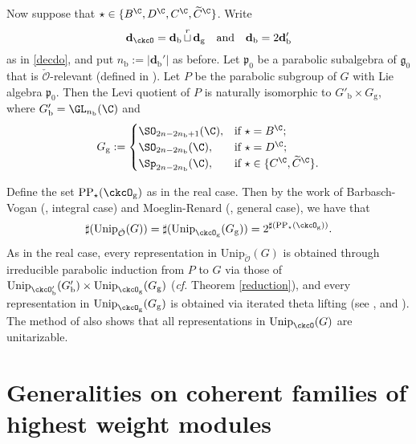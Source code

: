 \documentclass[12pt]{amsart}
\def\abs#1{\left|{#1}\right|}
\newcommand{\CO}{{\mathcal {O}}}
\newcommand{\g}{\mathfrak g}
\newcommand{\p}{\mathfrak p}
\numberwithin{equation}{section}
\theoremstyle{remark}
\def\cf{\emph{cf.} }
\def\Unip{\mathrm{Unip}}
\def\cuprow{{\stackrel{r}{\sqcup}}}
\def\CPP{\mathrm{PP}}
\def\cuprow{{\,\stackrel{r}{\sqcup}\,}}
\def\ckcOg{\ckcO_{\mathrm g}}
\def\Gpb{G'_{\mathrm b}}
\def\Gg{G_{\mathrm g}}
\begin{document}
Now suppose that $\star\in \{B^\C,D^\C, C^\C, \widetilde C^\C\}$. Write
\[
 \mathbf d_\ckcO=\mathbf d_\mathrm b\cuprow \mathbf d_\mathrm g\quad\textrm{and}\quad \mathbf d_\mathrm b=2 \mathbf d_\mathrm b'
\]
as in \eqref{decdo}, and put $n_\mathrm b:=\abs{\mathbf d_\mathrm b'}$ as before. %
Let $\p_0$ be a parabolic subalgebra of $\g_0$ that is $\check \CO$-relevant (defined in ). Let $P$ be the parabolic subgroup of $G$ with Lie algebra $\p_0$. Then the Levi quotient of $P$  is naturally isomorphic to $\Gpb\times \Gg$, where $\Gpb=\GL_{n_\mathrm b}(\C)$ and
\[
  \Gg :=
  \begin{cases}
    \SO_{2n-2n_\mathrm b+1}(\C), & \textrm{if $\star=B^\C$};\\
    \SO_{2n-2n_\mathrm b}(\C), & \textrm{if $\star=D^\C$};\\
    \Sp_{2n-2n_\mathrm b}(\C), &\textrm{if $\star \in\{ C^\C, \widetilde C^\C \}$}.
      \end{cases}
\]

Define the set $\CPP_\star(\ckcOg)$ as in the real case. Then by the work of
Barbasch-Vogan (\cite[Corollary 5.29]{BVUni}, integral case) and Moeglin-Renard
(\cite[Theorem~6.12 and Theorem~10.1]{MR.C}, general case), we have that
   \[
    \sharp(\Unip_{\check \CO}(G))=\sharp(\Unip_{\ckcOg}(\Gg))=2^{\sharp(\CPP_\star(\ckcOg))}.
  \]
   As in the real case, every representation in $\Unip_{\check \CO}(G)$ is
   obtained through irreducible parabolic induction from $P$ to $G$ via those of
   $ \Unip_{\ckcO'_{\mathrm b}}( G'_{\mathrm b})\times \Unip_{\ckcO_{\mathrm g}}( G_{\mathrm g}) $
   (\cf Theorem \ref{reduction}), and every representation in
   $\Unip_{\ckcOg}(\Gg)$ is obtained via iterated theta lifting (see
   \cite[Theorem 3.5.1]{B17}, \cite{Mo17} and \cite{BMSZ2}). The method of \cite{BMSZ2} also shows that all representations in $\Unip_{\ckcO}( G)$ are unitarizable.



\section{Generalities on coherent families of highest weight modules}\label{sec:HWM}


\end{document}
